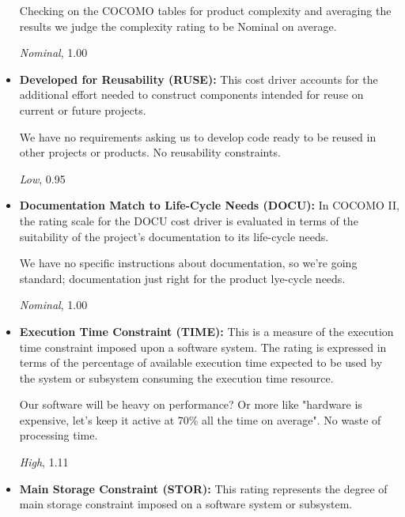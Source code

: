 \documentclass[english]{article}
\begin{document}
\begin{itemize}
Checking on the COCOMO tables for product complexity and averaging the results we judge the complexity rating to be Nominal on average.

\textit{Nominal}, 1.00

%

\item \textbf{Developed for Reusability (RUSE):} This cost driver accounts for the additional effort needed to construct components
intended for reuse on current or future projects.

We have no requirements asking us to develop code ready to be reused in other projects or products. No reusability constraints.

\textit{Low}, 0.95


\item \textbf{Documentation Match to Life-Cycle Needs (DOCU):} In COCOMO II, the rating scale for the DOCU cost driver is evaluated in terms of the suitability of the project’s documentation to its life-cycle needs.

We have no specific instructions about documentation, so we're going standard; documentation just right for the product lye-cycle needs.

\textit{Nominal}, 1.00


\item \textbf{Execution Time Constraint (TIME):} This is a measure of the execution time constraint imposed upon a software system. The rating is expressed in terms of the percentage of available execution time expected to be used by the system or subsystem consuming the execution time resource.

Our software will be heavy on performance? Or more like "hardware is expensive, let's keep it active at 70\% all the time on average". No waste of processing time.

\textit{High}, 1.11


\item \textbf{Main Storage Constraint (STOR):} This rating represents the degree of main storage constraint imposed on a software system or subsystem.


\end{itemize}
\end{document}
